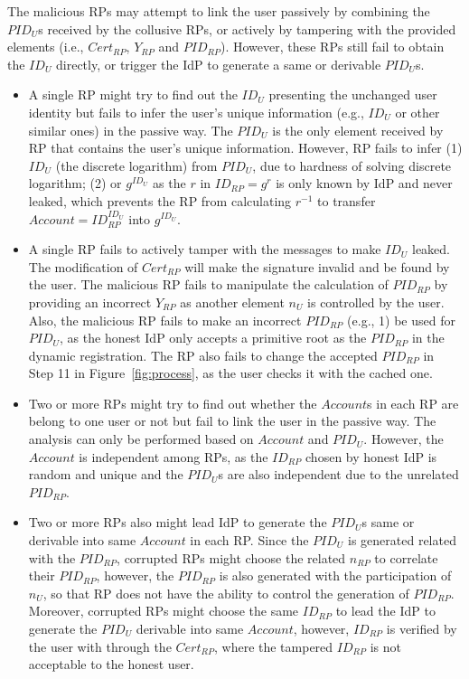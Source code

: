  The malicious RPs may attempt to link the user passively by combining the $PID_U$s received by the collusive RPs, or actively by tampering with the provided elements (i.e., $Cert_{RP}$, $Y_{RP}$ and $PID_{RP}$). However, these RPs still fail to obtain the $ID_U$ directly, or trigger the IdP to generate a same or derivable $PID_U$s.
\begin{itemize}
\item A single RP might try to find out the $ID_U$ presenting the unchanged user identity but fails to infer the user's unique information (e.g., $ID_U$ or other similar ones) in the passive way. The $PID_U$ is the only element received by RP that contains the user's unique information. However, RP fails to infer (1) $ID_U$ (the discrete logarithm) from $PID_U$, due to hardness of solving discrete logarithm; (2) or $g^{ID_U}$ as the $r$ in $ID_{RP}=g^r$ is only known by IdP and never leaked, which prevents the RP from calculating $r^{-1}$ to transfer $Account=ID_{RP}^{ID_U}$ into  $g^{ID_U}$.
\item A single RP fails to actively tamper with the messages to make $ID_U$ leaked. The modification of  $Cert_{RP}$ will make the signature invalid and be found by the user. The malicious RP fails to manipulate  the calculation of $PID_{RP}$ by providing an incorrect $Y_{RP}$ as another element $n_U$ is  controlled by the user. Also, the malicious RP fails to make an incorrect $PID_{RP}$ (e.g., 1)  be used for $PID_U$, as the honest IdP only accepts a primitive root as the $PID_{RP}$ in the dynamic registration. The RP also fails to change the accepted $PID_{RP}$ in Step 11 in Figure~\ref{fig:process}, as the user checks it with the cached one.
\item Two or more RPs might try to find out whether the $Account$s in each RP are belong to one user or not but fail to link the user in the passive way. The analysis can only be performed based on $Account$ and $PID_U$. However, the $Account$ is independent among RPs, as the $ID_{RP}$ chosen by honest IdP is random and unique and the $PID_U$s are  also independent due to the unrelated $PID_{RP}$.
\item Two or more RPs also might lead IdP to generate the $PID_U$s same or  derivable into same $Account$ in each RP. Since the $PID_U$ is generated related with the $PID_{RP}$, corrupted RPs might choose the related $n_{RP}$ to correlate their $PID_{RP}$, however, the $PID_{RP}$ is also generated with the participation of $n_{U}$, so that RP does not have the ability to control the generation of $PID_{RP}$. Moreover, corrupted RPs might choose the same $ID_{RP}$ to lead the IdP to generate the $PID_U$ derivable into same $Account$, however, $ID_{RP}$ is verified by the user with through the $Cert_{RP}$, where the tampered $ID_{RP}$ is not acceptable to the honest user.

\end{itemize}
